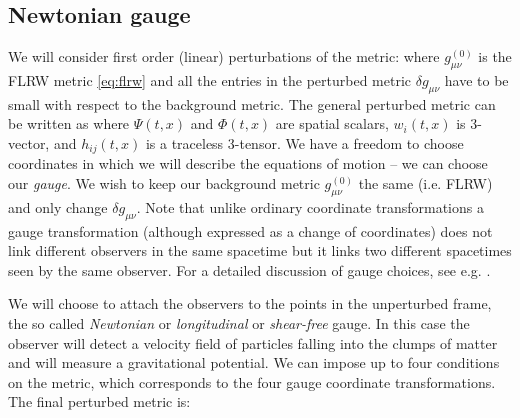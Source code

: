 \subsection{Newtonian gauge}
We will consider first order (linear) perturbations of the metric:
where $g_{\mu\nu}^{(0)}$ is the FLRW metric \autoref{eq:flrw} and all the entries in the perturbed metric $\delta g_{\mu\nu}$ have to be small with respect to the background metric. The general perturbed metric can be written as
where $\Psi(t,x)$ and $\Phi(t,x)$ are spatial scalars, $w_i(t,x)$ is 3-vector, and $h_{ij}(t,x)$ is a traceless 3-tensor. We have a freedom to choose coordinates in which we will describe the equations of motion -- we can choose our \textit{gauge}. We wish to keep our background metric $g_{\mu\nu}^{(0)}$ the same (i.e. FLRW) and only change $\delta g_{\mu\nu}$. Note that unlike ordinary coordinate transformations a gauge transformation (although expressed as a change of coordinates) does not link different observers in the same spacetime but it links two different spacetimes seen by the same observer. For a detailed discussion of gauge choices, see e.g. \cite{PhysRevD.40.1804,10.1143/PTPS.78.1,PhysRevD.22.1882}.

We will choose to attach the observers to the points in the unperturbed frame, the so called \textit{Newtonian} or \textit{longitudinal} or \textit{shear-free} gauge. In this case the observer will detect a velocity field of particles falling into the clumps of matter and will measure a gravitational potential. We can impose up to four conditions on the metric, which corresponds to the four gauge coordinate transformations. The final perturbed metric is:
